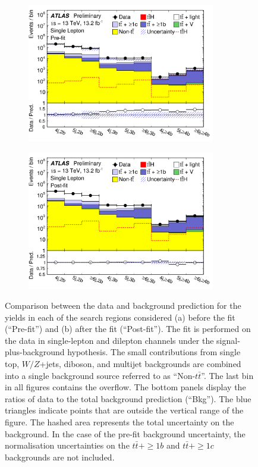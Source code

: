 \begin{figure}[htbp!]
\begin{subfigure}{0.5\textwidth}
  \centering
  \includegraphics[width=0.9\textwidth]{figures/ttH/fig_04b.png}
  \caption{}
  \label{}
\end{subfigure}
\begin{subfigure}{0.5\textwidth}
  \centering
  \includegraphics[width=0.9\textwidth]{figures/ttH/fig_17b.png}
  \caption{}
  \label{}
\end{subfigure}
\captionsetup{width=0.85\textwidth}  \caption{\small Comparison between the data and background prediction for the yields in each of the search regions considered (a) before the fit (``Pre-fit'') and (b) after the fit (``Post-fit''). The fit is performed on the data in single-lepton and dilepton channels under the signal-plus-background hypothesis. The small contributions from single top, $W/Z$+jets, diboson, and multijet backgrounds are combined into a single background source  referred to as ``Non-$t\bar{t}$''. The last bin in all figures contains the overflow. The bottom panels display the ratios of data to the total background prediction (``Bkg''). The blue triangles indicate points that are outside the vertical range of the figure. The hashed area represents the total uncertainty on the background. In the case of the pre-fit background uncertainty, the normalisation uncertainties on the $t\bar{t}+\ge1b$ and $t\bar{t}+\ge1c$ backgrounds are not included.}
\label{sec:ttH:fig:summary}
\end{figure}

